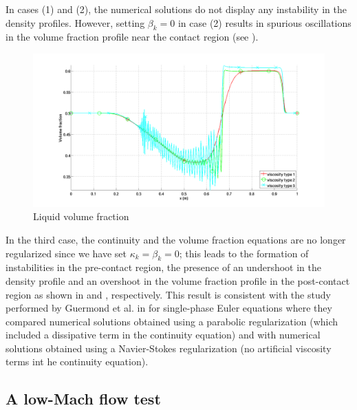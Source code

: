 \documentclass[preprint,10pt]{elsarticle}
\begin{document}
%
In cases (1) and (2), the numerical solutions do not display any instability in the density profiles. However, setting $\beta_k=0$ in case (2) results 
in spurious oscillations in the volume fraction profile near the contact region (see ). 
%
\begin{figure}[H]
        \centering
        \includegraphics[width=\textwidth]{../figures/paper/relaxation_liquid_vf_multiple_visc.png}
        \caption{Liquid volume fraction}
        \label{fig:liq-vf}
\end{figure}
%
In the third case, the continuity and the volume fraction equations are no longer regularized since we have set $\kappa_k=\beta_k=0$; this leads to 
the formation of instabilities in the pre-contact region, the presence of an undershoot in the density profile and an overshoot in the volume 
fraction profile in the post-contact region as shown in  and , respectively. This result is consistent with 
the study performed by Guermond et al. in \cite{jlg} for single-phase Euler equations where they compared numerical solutions obtained using 
a parabolic regularization (which included a dissipative term in the continuity equation) and with numerical solutions obtained using a 
Navier-Stokes regularization (no artificial viscosity terms int he continuity equation).
%
\subsection{A low-Mach flow test}\label{sec:second-test}
%
\end{document}
